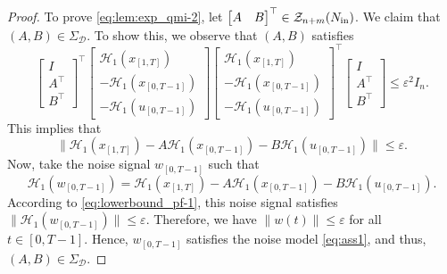 \documentclass[journal,twoside,web]{ieeecolor}
\begin{document}
\begin{proof}
To prove \eqref{eq:lem:exp_qmi-2}, let $\begin{bmatrix}
A & B
\end{bmatrix}^\top\in\mathcal{Z}_{n+m}(N_\textup{in})$. We claim that $(A,B)\in\Sigma_\mathcal{D}$. To show this, we observe that $(A,B)$ satisfies 
\begin{equation}
\label{eq:lem:exp_qmi_pf-4}
\begin{bmatrix}
I \\ A^\top \\ B^\top
\end{bmatrix}^{\!\top}\!\!\begin{bmatrix}
\mathcal{H}_1(x_{[1,T]}) \\
-\mathcal{H}_1(x_{[0,T-1]}) \\
-\mathcal{H}_1(u_{[0,T-1]})
\end{bmatrix}\!\!\begin{bmatrix}
\mathcal{H}_1(x_{[1,T]}) \\
-\mathcal{H}_1(x_{[0,T-1]}) \\
-\mathcal{H}_1(u_{[0,T-1]})
\end{bmatrix}^{\!\top}\!\!\begin{bmatrix}
I \\ A^\top \\ B^\top
\end{bmatrix} \leq  \varepsilon^2 I_n.
\end{equation}
This implies that
\begin{equation}
\label{eq:lowerbound_pf-1}
\|\mathcal{H}_1(x_{[1,T]})-A\mathcal{H}_1(x_{[0,T-1]})-B\mathcal{H}_1(u_{[0,T-1]})\|\leq \varepsilon.
\end{equation} 
Now, take the noise signal $w_{[0,T-1]}$ such that
\begin{equation}
\label{eq:lowerbound_pf-2}
\mathcal{H}_1(w_{[0,T-1]})\!=\!\mathcal{H}_1(x_{[1,T]})-A\mathcal{H}_1(x_{[0,T-1]})-B\mathcal{H}_1(u_{[0,T-1]}).
\end{equation}
According to \eqref{eq:lowerbound_pf-1}, this noise signal satisfies $\|\mathcal{H}_1(w_{[0,T-1]})\|\leq\varepsilon$. Therefore, we have $\|w(t)\|\leq\varepsilon$ for all $t\in[0,T-1]$. Hence, $w_{[0,T-1]}$ satisfies the noise model \eqref{eq:ass1}, and thus, $(A,B)\in\Sigma_\mathcal{D}$. 


\end{proof}
\end{document}
